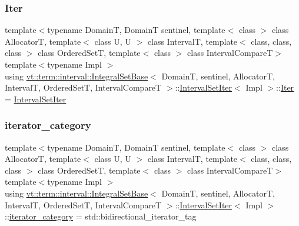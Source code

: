 \subsubsection{\texorpdfstring{Iter}{Iter}}
{\footnotesize\ttfamily template$<$typename DomainT, DomainT sentinel, template$<$ class $>$ class AllocatorT, template$<$ class U, U $>$ class IntervalT, template$<$ class, class, class $>$ class Ordered\+SetT, template$<$ class $>$ class Interval\+CompareT$>$ \\
template$<$typename Impl $>$ \\
using \hyperlink{structvt_1_1term_1_1interval_1_1_integral_set_base}{vt\+::term\+::interval\+::\+Integral\+Set\+Base}$<$ DomainT, sentinel, AllocatorT, IntervalT, Ordered\+SetT, Interval\+CompareT $>$\+::\hyperlink{structvt_1_1term_1_1interval_1_1_integral_set_base_1_1_interval_set_iter}{Interval\+Set\+Iter}$<$ Impl $>$\+::\hyperlink{structvt_1_1term_1_1interval_1_1_integral_set_base_1_1_interval_set_iter_a4056b2dcca9f60143d2d76387599e6e1}{Iter} =  \hyperlink{structvt_1_1term_1_1interval_1_1_integral_set_base_1_1_interval_set_iter}{Interval\+Set\+Iter}}

\mbox{\label{structvt_1_1term_1_1interval_1_1_integral_set_base_1_1_interval_set_iter_a50527fe18f4660916ae341f4d06b40d4}} 
\subsubsection{\texorpdfstring{iterator\+\_\+category}{iterator\_category}}
{\footnotesize\ttfamily template$<$typename DomainT, DomainT sentinel, template$<$ class $>$ class AllocatorT, template$<$ class U, U $>$ class IntervalT, template$<$ class, class, class $>$ class Ordered\+SetT, template$<$ class $>$ class Interval\+CompareT$>$ \\
template$<$typename Impl $>$ \\
using \hyperlink{structvt_1_1term_1_1interval_1_1_integral_set_base}{vt\+::term\+::interval\+::\+Integral\+Set\+Base}$<$ DomainT, sentinel, AllocatorT, IntervalT, Ordered\+SetT, Interval\+CompareT $>$\+::\hyperlink{structvt_1_1term_1_1interval_1_1_integral_set_base_1_1_interval_set_iter}{Interval\+Set\+Iter}$<$ Impl $>$\+::\hyperlink{structvt_1_1term_1_1interval_1_1_integral_set_base_1_1_interval_set_iter_a50527fe18f4660916ae341f4d06b40d4}{iterator\+\_\+category} =  std\+::bidirectional\+\_\+iterator\+\_\+tag}

